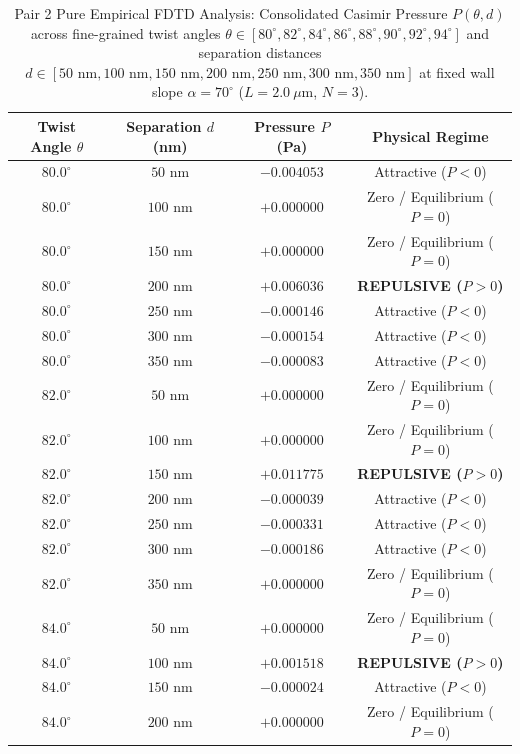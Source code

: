 \documentclass[12pt,letterpaper]{article}
\begin{document}
\begin{table}[h!]
\centering
\caption{Pair 2 Pure Empirical FDTD Analysis: Consolidated Casimir Pressure $P(\theta, d)$ across fine-grained twist angles $\theta \in [80^\circ, 82^\circ, 84^\circ, 86^\circ, 88^\circ, 90^\circ, 92^\circ, 94^\circ]$ and separation distances $d \in [50\text{ nm}, 100\text{ nm}, 150\text{ nm}, 200\text{ nm}, 250\text{ nm}, 300\text{ nm}, 350\text{ nm}]$ at fixed wall slope $\alpha = 70^\circ$ ($L=2.0\ \mu\text{m}$, $N=3$).}
\begin{tabular}{cccc}
\hline
\textbf{Twist Angle $\theta$} & \textbf{Separation $d$ (nm)} & \textbf{Pressure $P$ (Pa)} & \textbf{Physical Regime} \\
\hline
$80.0^\circ$ & $50$ nm & $-0.004053$ & Attractive ($P<0$) \\
$80.0^\circ$ & $100$ nm & $+0.000000$ & Zero / Equilibrium ($P=0$) \\
$80.0^\circ$ & $150$ nm & $+0.000000$ & Zero / Equilibrium ($P=0$) \\
$80.0^\circ$ & $200$ nm & $+0.006036$ & \textbf{REPULSIVE ($P>0$)} \\
$80.0^\circ$ & $250$ nm & $-0.000146$ & Attractive ($P<0$) \\
$80.0^\circ$ & $300$ nm & $-0.000154$ & Attractive ($P<0$) \\
$80.0^\circ$ & $350$ nm & $-0.000083$ & Attractive ($P<0$) \\
$82.0^\circ$ & $50$ nm & $+0.000000$ & Zero / Equilibrium ($P=0$) \\
$82.0^\circ$ & $100$ nm & $+0.000000$ & Zero / Equilibrium ($P=0$) \\
$82.0^\circ$ & $150$ nm & $+0.011775$ & \textbf{REPULSIVE ($P>0$)} \\
$82.0^\circ$ & $200$ nm & $-0.000039$ & Attractive ($P<0$) \\
$82.0^\circ$ & $250$ nm & $-0.000331$ & Attractive ($P<0$) \\
$82.0^\circ$ & $300$ nm & $-0.000186$ & Attractive ($P<0$) \\
$82.0^\circ$ & $350$ nm & $+0.000000$ & Zero / Equilibrium ($P=0$) \\
$84.0^\circ$ & $50$ nm & $+0.000000$ & Zero / Equilibrium ($P=0$) \\
$84.0^\circ$ & $100$ nm & $+0.001518$ & \textbf{REPULSIVE ($P>0$)} \\
$84.0^\circ$ & $150$ nm & $-0.000024$ & Attractive ($P<0$) \\
$84.0^\circ$ & $200$ nm & $+0.000000$ & Zero / Equilibrium ($P=0$) \\

\end{tabular}
\end{table}
\end{document}
